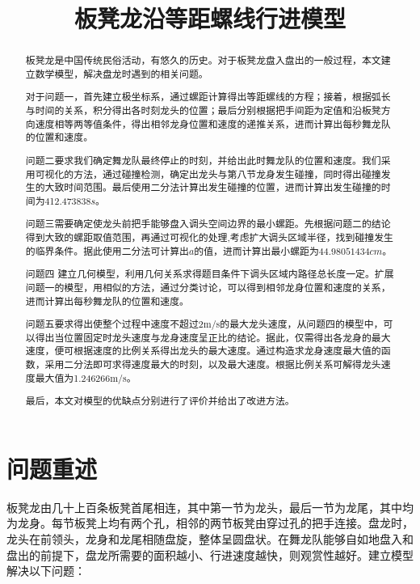 \documentclass[withoutpreface,bwprint]{cumcmthesis} %
\title{板凳龙沿等距螺线行进模型}
\begin{document}
\maketitle
\begin{abstract}

板凳龙是中国传统民俗活动，有悠久的历史。对于板凳龙盘入盘出的一般过程，本文建立数学模型，解决盘龙时遇到的相关问题。

对于问题一，首先建立极坐标系，通过螺距计算得出等距螺线的方程；接着，根据弧长与时间的关系，积分得出各时刻龙头的位置；最后分别根据把手间距为定值和沿板凳方向速度相等两等值条件，得出相邻龙身位置和速度的递推关系，进而计算出每秒舞龙队的位置和速度。

问题二要求我们确定舞龙队最终停止的时刻，并给出此时舞龙队的位置和速度。我们采用可视化的方法，通过碰撞检测，确定出龙头与第八节龙身发生碰撞，同时得出碰撞发生的大致时间范围。最后使用二分法计算出发生碰撞的位置，进而计算出发生碰撞的时间为412.473838$s$。

问题三需要确定使龙头前把手能够盘入调头空间边界的最小螺距。先根据问题二的结论得到大致的螺距取值范围，再通过可视化的处理,考虑扩大调头区域半径，找到碰撞发生的临界条件。据此使用二分法可计算出$a$的值，进而计算出最小螺距为$44.98051434cm$。

问题四
建立几何模型，利用几何关系求得题目条件下调头区域内路径总长度一定。扩展问题一的模型，用相似的方法，通过分类讨论，可以得到相邻龙身位置和速度的关系，进而计算出每秒舞龙队的位置和速度。

问题五要求得出使整个过程中速度不超过2m/s的最大龙头速度，从问题四的模型中，可以得出当位置固定时龙头速度与龙身速度呈正比的结论。据此，仅需得出各龙身的最大速度，便可根据速度的比例关系得出龙头的最大速度。通过构造求龙身速度最大值的函数，采用二分法即可求得速度最大的时刻，以及最大速度。根据比例关系可解得龙头速度最大值为1.246266m/s。

最后，本文对模型的优缺点分别进行了评价并给出了改进方法。


\end{abstract}



\section{问题重述}

板凳龙由几十上百条板凳首尾相连，其中第一节为龙头，最后一节为龙尾，其中均为龙身。每节板凳上均有两个孔，相邻的两节板凳由穿过孔的把手连接。盘龙时，龙头在前领头，龙身和龙尾相随盘旋，整体呈圆盘状。在舞龙队能够自如地盘入和盘出的前提下，盘龙所需要的面积越小、行进速度越快，则观赏性越好。建立模型解决以下问题：
\end{document}
